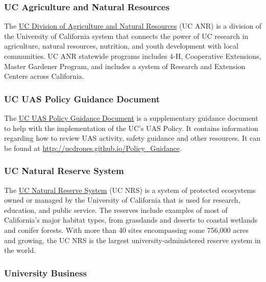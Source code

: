 \documentclass[
]{book}
\begin{document}
\hypertarget{ANR}{%
\subsubsection*{UC Agriculture and Natural Resources}\label{ANR}}

The \protect\hyperlink{ANR}{UC Division of Agriculture and Natural Resources} (UC ANR) is a division of the University of California system that connects the power of UC research in agriculture, natural resources, nutrition, and youth development with local communities. UC ANR statewide programs includes 4-H, Cooperative Extensions, Master Gardener Program, and includes a system of Research and Extension Centers across California.



\hypertarget{UASPGD}{%
\subsubsection*{UC UAS Policy Guidance Document}\label{UASPGD}}

The \protect\hyperlink{UASPGD}{UC UAS Policy Guidance Document} is a supplementary guidance document to help with the implementation of the UC's UAS Policy. It contains information regarding how to review UAS activity, safety guidance and other resources. It can be found at \url{http://ucdrones.github.io/Policy_Guidance}.



\hypertarget{NRS}{%
\subsubsection*{UC Natural Reserve System}\label{NRS}}

The \protect\hyperlink{NRS}{UC Natural Reserve System} (UC NRS) is a system of protected ecosystems owned or managed by the University of California that is used for research, education, and public service. The reserves include examples of most of California's major habitat types, from grasslands and deserts to coastal wetlands and conifer forests. With more than 40 sites encompassing some 756,000 acres and growing, the UC NRS is the largest university-administered reserve system in the world.



\hypertarget{UB}{%
\subsubsection*{University Business}\label{UB}}
\end{document}
